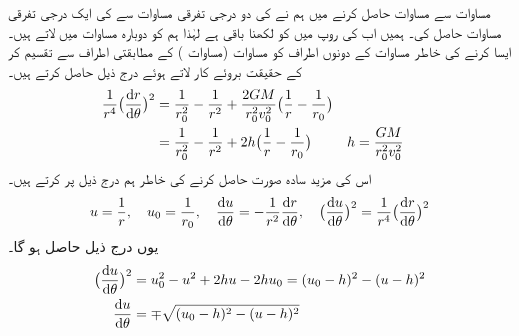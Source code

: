 مساوات   سے مساوات   حاصل کرنے میں ہم نے   کی دو درجی  تفرقی مساوات سے   کی ایک درجی تفرقی مساوات حاصل کی۔ ہمیں اب  کی روپ میں  کو  لکھنا باقی ہے   لہٰذا ہم  کو دوبارہ مساوات میں لاتے ہیں۔ایسا کرنے کی خاطر  مساوات   کے دونوں اطراف کو مساوات  (مساوات ) کے مطابقتی اطراف سے تقسیم کر  کے حقیقت
  بروئے کار لاتے ہوئے درج ذیل حاصل کرتے ہیں۔
\begin{align}\label{مساوات_سمتی_تفاعل_کپلر_ثبوت_پہلا_ث}
\frac{1}{r^4}\big(\frac{\dif r}{\dif\theta}\big)^2&=\frac{1}{r_0^2}-\frac{1}{r^2}+\frac{2GM}{r_0^2v_0^2}\big(\frac{1}{r}-\frac{1}{r_0}\big)\\
&=\frac{1}{r_0^2}-\frac{1}{r^2}+2h\big(\frac{1}{r}-\frac{1}{r_0}\big)&&h=\frac{GM}{r_0^2v_0^2}
\end{align}
اس کی مزید سادہ صورت حاصل کرنے کی خاطر  ہم درج ذیل پر کرتے ہیں۔
 \begin{align*}
u=\frac{1}{r},\quad u_0=\frac{1}{r_0},\quad \frac{\dif u}{\dif\theta}=-\frac{1}{r^2}\frac{\dif r}{\dif \theta},\quad \big(\frac{\dif u}{\dif\theta}\big)^2=\frac{1}{r^4}\big(\frac{\dif r}{\dif\theta}\big)^2
\end{align*}
یوں  درج ذیل حاصل ہو گا۔
\begin{align}
\big(\frac{\dif u}{\dif\theta}\big)^2&=u_0^2-u^2+2hu-2hu_0=(u_0-h)^2-(u-h)^2\label{مساوات_سمتی_تفاعل_کپلر_ثبوت_پہلا_ج}\\
\frac{\dif u}{\dif \theta}&=\mp\sqrt{(u_0-h)^2-(u-h)^2}\label{مساوات_سمتی_تفاعل_کپلر_ثبوت_پہلا_چ}
\end{align}

